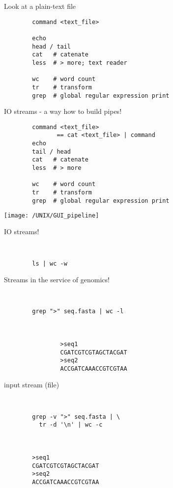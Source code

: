 \documentclass[xcolor=dvipsnames]{beamer}
\begin{document}
\begin{frame}[fragile]
	\huge
	Look at a plain-text file
	\Large
	\begin{verbatim}
		command <text_file>

		echo
		head / tail
		cat   # catenate
		less  # > more; text reader

		wc    # word count
		tr    # transform
		grep  # global regular expression print
	\end{verbatim}
\end{frame}

\begin{frame}[fragile]
	\huge
	IO streams - a way how to build pipes!
	\Large
	\begin{verbatim}
		command <text_file>
	           == cat <text_file> | command
		echo
		tail / head
		cat   # catenate
		less  # > more

		wc    # word count
		tr    # transform
		grep  # global regular expression print
	\end{verbatim}
\end{frame}

\begin{frame}
	\begin{center}
		\texttt{[image: /UNIX/GUI\_pipeline]}
	\end{center}
\end{frame}

\begin{frame}[fragile]
	\huge
	IO streams!
	\Large
	\begin{verbatim}


		ls | wc -w
	\end{verbatim}
\end{frame}

\begin{frame}[fragile]
	\huge
	Streams in the service of genomics!
	\Large
	\begin{verbatim}


		grep ">" seq.fasta | wc -l



				>seq1
				CGATCGTCGTAGCTACGAT
				>seq2
				ACCGATCAAACCGTCGTAA
	\end{verbatim}
\end{frame}

\begin{frame}[fragile]
	\huge
	input stream (file)
	\Large
	\begin{verbatim}


		grep -v ">" seq.fasta | \
		  tr -d '\n' | wc -c



		>seq1
		CGATCGTCGTAGCTACGAT
		>seq2
		ACCGATCAAACCGTCGTAA
	\end{verbatim}
\end{frame}
\end{document}

